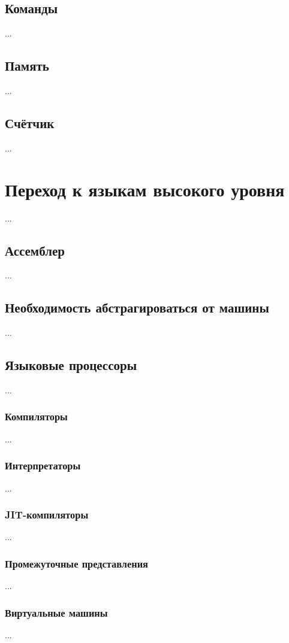 \documentclass[11pt]{book}
\begin{document}
\section{Команды}
...
\section{Память}
...
\section{Счётчик}
...
\chapter{Переход к языкам высокого уровня}
...
\section{Ассемблер}
...
\section{Необходимость абстрагироваться от машины}
...
\section{Языковые процессоры}
...
\subsection{Компиляторы}
...
\subsection{Интерпретаторы}
...
\subsection{JIT-компиляторы}
...
\subsection{Промежуточные представления}
...
\subsection{Виртуальные машины}
...
\end{document}
